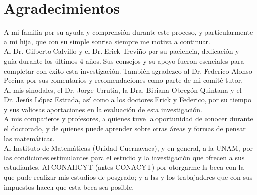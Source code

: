 \chapter*{Agradecimientos}

A mi familia por su ayuda y comprensión durante este proceso, y particularmente a mi hija, que con su simple sonrisa siempre me motiva a continuar.\\

Al Dr. Gilberto Calvillo y el Dr. Erick Treviño por su paciencia, dedicación y guía durante los últimos 4 años. Sus consejos y su apoyo fueron esenciales para completar con éxito esta investigación. También agradezco al Dr. Federico Alonso Pecina por sus comentarios y recomendaciones como parte de mi comité tutor.\\

Al mis sinodales, el Dr. Jorge Urrutia, la Dra. Bibiana Obregón Quintana y el Dr. Jesús López Estrada, así como a los doctores Erick y Federico, por su tiempo y sus valiosas aportaciones en la evaluación de esta investigación.\\

A mis compañeros y profesores, a quienes tuve la oportunidad de conocer durante el doctorado, y de quienes puede aprender sobre otras áreas y formas de pensar las matemáticas.\\

Al Instituto de Matemáticas (Unidad Cuernavaca), y en general, a la UNAM, por las condiciones estimulantes para el estudio y la investigación que ofrecen a sus estudiantes. Al CONAHCYT (antes CONACYT) por otorgarme la beca con la que pude realizar mis estudios de posgrado; y a las y los trabajadores que con sus impuestos hacen que esta beca sea posible.